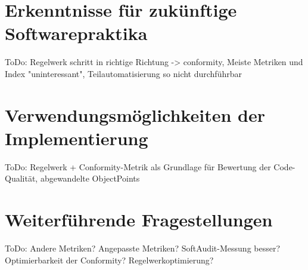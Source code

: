\documentclass[da,ngerman]{stthesis}
\begin{document}
		\section{Erkenntnisse für zukünftige Softwarepraktika}
			ToDo: Regelwerk schritt in richtige Richtung -> conformity, Meiste Metriken und Index "uninteressant", Teilautomatisierung so nicht durchführbar
		\section{Verwendungsmöglichkeiten der Implementierung}
			ToDo: Regelwerk + Conformity-Metrik als Grundlage für Bewertung der Code-Qualität, abgewandelte ObjectPoints
		\section{Weiterführende Fragestellungen}
			ToDo: Andere Metriken? Angepasste Metriken? SoftAudit-Messung besser? Optimierbarkeit der Conformity? Regelwerkoptimierung? 		
  		
  	\backmatter
  
  	\appendix
  	
  
\end{document}

